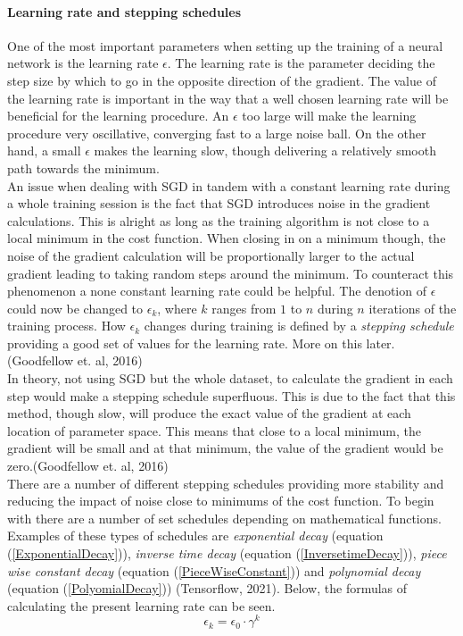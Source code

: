 \documentclass{article}
\begin{document}
\paragraph{Learning rate and stepping schedules}\label{sec: Schedules}

\hfill \break

\noindent One of the most important parameters when setting up the training of a neural network is the learning rate $\epsilon$. The learning rate is the parameter deciding the step size by which to go in the opposite direction of the gradient. The value of the learning rate is important in the way that a well chosen learning rate will be beneficial for the learning procedure. An $\epsilon$ too large will make the learning procedure very oscillative, converging fast to a large noise ball. On the other hand, a small $\epsilon$ makes the learning slow, though delivering a relatively smooth path towards the minimum. \\

\noindent An issue when dealing with SGD in tandem with a constant learning rate during a whole training session is the fact that SGD introduces noise in the gradient calculations. This is alright as long as the training algorithm is not close to a local minimum in the cost function. When closing in on a minimum though, the noise of the gradient calculation will be proportionally larger to the actual gradient leading to taking random steps around the minimum. To counteract this phenomenon a none constant learning rate could be helpful. The denotion of $\epsilon$ could now be changed to $\epsilon_k$, where $k$ ranges from $1$ to $n$ during $n$ iterations of the training process. How $\epsilon_k$ changes during training is defined by a \textit{stepping schedule} providing a good set of values for the learning rate. More on this later. (Goodfellow et. al, 2016)\\

\noindent In theory, not using SGD but the whole dataset, to calculate the gradient in each step would make a stepping schedule superfluous. This is due to the fact that this method, though slow, will produce the exact value of the gradient at each location of parameter space. This means that close to a local minimum, the gradient will be small and at that minimum, the value of the gradient would be zero.(Goodfellow et. al, 2016) \\

\noindent There are a number of different stepping schedules providing more stability and reducing the impact of noise close to minimums of the cost function. To begin with there are a number of set schedules depending on mathematical functions. Examples of these types of schedules are \textit{exponential decay} (equation (\ref{ExponentialDecay})), \textit{inverse time decay} (equation (\ref{InversetimeDecay})), \textit{piece wise constant decay} (equation (\ref{PieceWiseConstant})) and \textit{polynomial decay} (equation (\ref{PolyomialDecay})) (Tensorflow, 2021). Below, the formulas of calculating the present learning rate can be seen.
\begin{equation}\label{ExponentialDecay}
    \epsilon_k = \epsilon_0 \cdot \gamma^k
\end{equation}
\end{document}
